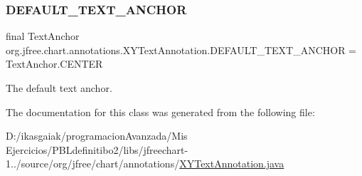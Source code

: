 \subsubsection{\texorpdfstring{D\+E\+F\+A\+U\+L\+T\+\_\+\+T\+E\+X\+T\+\_\+\+A\+N\+C\+H\+OR}{DEFAULT\_TEXT\_ANCHOR}}
{\footnotesize\ttfamily final Text\+Anchor org.\+jfree.\+chart.\+annotations.\+X\+Y\+Text\+Annotation.\+D\+E\+F\+A\+U\+L\+T\+\_\+\+T\+E\+X\+T\+\_\+\+A\+N\+C\+H\+OR = Text\+Anchor.\+C\+E\+N\+T\+ER\hspace{0.3cm}{\ttfamily [static]}}

The default text anchor. 

The documentation for this class was generated from the following file\+:\begin{DoxyCompactItemize}
\item 
D\+:/ikasgaiak/programacion\+Avanzada/\+Mis Ejercicios/\+P\+B\+Ldefinitibo2/libs/jfreechart-\/1../source/org/jfree/chart/annotations/\mbox{\hyperlink{_x_y_text_annotation_8java}{X\+Y\+Text\+Annotation.\+java}}\end{DoxyCompactItemize}
